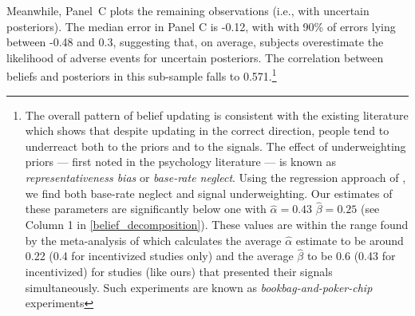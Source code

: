 \documentclass[12pt,a4paper]{article}
\begin{document}
Meanwhile, Panel~C plots the remaining observations (i.e., with uncertain posteriors). The median error in Panel C is -0.12, with with 90\% of errors lying between -0.48 and 0.3, suggesting that, on average, subjects overestimate the likelihood of adverse events for uncertain posteriors. The correlation between beliefs and posteriors in this sub-sample falls to 0.571.\footnote{The overall pattern of belief updating is consistent with the existing literature which shows that despite updating in the correct direction, people tend to underreact both to the priors and to the signals. The effect of underweighting priors --- first noted in the psychology literature \citep*{phillips_conservatism_1966-1, tversky_belief_1971, kahneman_subjective_1972} --- is known as \emph{representativeness bias} or \emph{base-rate neglect}. Using the regression approach of \citet{grether_bayes_1980}, we find both base-rate neglect and signal underweighting. Our estimates of these parameters are significantly below one with $\hat \alpha=0.43$ $\hat \beta=0.25$ (see Column 1 in \ref{belief_decomposition}). These values are within the range found by the meta-analysis of \citet{benjamin_chapter_2019} which calculates the average $\hat \alpha$ estimate to be around 0.22 (0.4 for incentivized studies only) and the average $\hat \beta$ to be 0.6 (0.43 for incentivized) for studies (like ours) that presented their signals simultaneously.  Such experiments are known as \emph{bookbag-and-poker-chip} experiments} 

\end{document}
